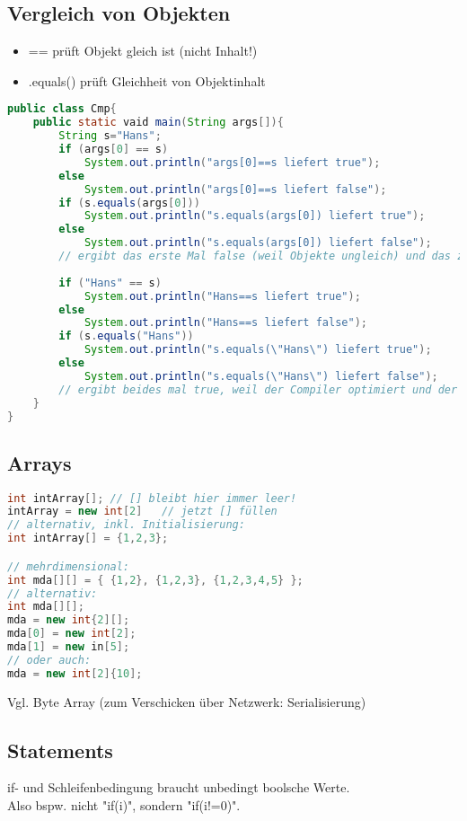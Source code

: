 \subsection{Vergleich von Objekten}
\begin{itemize}
\item == prüft Objekt gleich ist (nicht Inhalt!)
\item .equals() prüft Gleichheit von Objektinhalt
\end{itemize}
\begin{lstlisting}[language=Java]
public class Cmp{
	public static vaid main(String args[]){
		String s="Hans";
		if (args[0] == s)
			System.out.println("args[0]==s liefert true");
		else
			System.out.println("args[0]==s liefert false");
		if (s.equals(args[0]))
			System.out.println("s.equals(args[0]) liefert true");
		else
			System.out.println("s.equals(args[0]) liefert false");
		// ergibt das erste Mal false (weil Objekte ungleich) und das zweite Mal true (weil Objektinhalt gleich).
			
		if ("Hans" == s)
			System.out.println("Hans==s liefert true");
		else
			System.out.println("Hans==s liefert false");
		if (s.equals("Hans"))
			System.out.println("s.equals(\"Hans\") liefert true");
		else
			System.out.println("s.equals(\"Hans\") liefert false");
		// ergibt beides mal true, weil der Compiler optimiert und der "Hans" String nicht doppelt erzeugt wurde.
	}
}
\end{lstlisting}

\subsection{Arrays}
\begin{lstlisting}[language=Java]
int intArray[];	// [] bleibt hier immer leer!
intArray = new int[2]	// jetzt [] füllen
// alternativ, inkl. Initialisierung:
int intArray[] = {1,2,3};

// mehrdimensional:
int mda[][] = { {1,2}, {1,2,3}, {1,2,3,4,5} };
// alternativ:
int mda[][];
mda = new int{2][];
mda[0] = new int[2];
mda[1] = new in[5];
// oder auch:
mda = new int[2]{10];
\end{lstlisting}
Vgl. Byte Array (zum Verschicken über Netzwerk: Serialisierung)

\subsection{Statements}
if- und Schleifenbedingung braucht unbedingt boolsche Werte.\\
Also bspw. nicht "if(i)", sondern "if(i!=0)".

